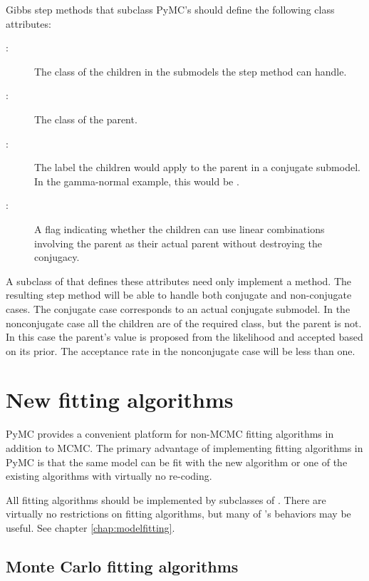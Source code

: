 Gibbs step methods that subclass PyMC's  should define the following class attributes:
\begin{description}
   \item[:] The class of the children in the submodels the step method can handle.
   \item[:] The class of the parent.
   \item[:] The label the children would apply to the parent in a conjugate submodel. In the gamma-normal example, this would be .
   \item[:] A flag indicating whether the children can use linear combinations involving the parent as their actual parent without destroying the conjugacy.
\end{description}

A subclass of  that defines these attributes need only implement a  method. The resulting step method will be able to handle both conjugate and non-conjugate cases. The conjugate case corresponds to an actual conjugate submodel. In the nonconjugate case all the children are of the required class, but the parent is not. In this case the parent's value is proposed from the likelihood and accepted based on its prior. The acceptance rate in the nonconjugate case will be less than one.

\hypertarget{custom-model}{}
\section*{New fitting algorithms} \label{custom-model}

PyMC provides a convenient platform for non-MCMC fitting algorithms in addition to MCMC. The primary advantage of implementing fitting algorithms in PyMC is that the same model can be fit with the new algorithm or one of the existing algorithms with virtually no re-coding.

All fitting algorithms should be implemented by subclasses of . There are virtually no restrictions on fitting algorithms, but many of 's behaviors may be useful. See chapter \ref{chap:modelfitting}. 

\hypertarget{custom-MC}{}
\subsection*{Monte Carlo fitting algorithms} \label{custom-MC}


